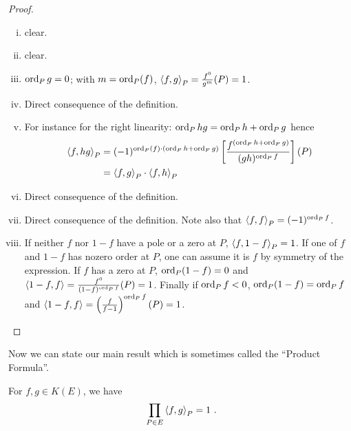 \begin{proof}
~
\begin{enumerate}[(i)]
\item
clear.
\item
clear.
\item
$\operatorname{ord}_{P}g=0$; with $m=\operatorname{ord}_{P}(f)$, $\left\langle f,g \right \rangle_{P} = \frac{f^0}{g^m}(P) = 1$.
\item
Direct consequence of the definition.
\item
For instance for the right linearity: $\operatorname{ord}_{P}{hg} = \operatorname{ord}_{P}{h}+\operatorname{ord}_{P}{g}$ hence 
\begin{align*}
\left\langle f,hg \right \rangle_{P} &= (-1)^{\operatorname{ord}_{P}(f)\cdot(\operatorname{ord}_{P}{h}+\operatorname{ord}_{P}{g})}\left[\frac{f^{(\operatorname{ord}_{P}{h}+\operatorname{ord}_{P}{g})}}{(gh)^{\operatorname{ord}_{P}f}}\right](P) \\
&=\left\langle f,g \right \rangle_{P} \cdot \left\langle f,h \right \rangle_{P}
\end{align*}
\item
Direct consequence of the definition.
\item
Direct consequence of the definition. Note also that $\left\langle f,f \right \rangle_P = (-1)^{\operatorname{ord}_{P}f}$.
\item
If neither $f$ nor $1-f$ have a pole or a zero at $P$, $\left\langle f,1-f \right \rangle_{P}=1$. If one of $f$ and $1-f$ has nozero order at $P$, one can assume it is $f$ by symmetry of the expression. If $f$ has a zero at $P$, $\operatorname{ord}_{P}(1-f)=0$ and $\left\langle 1-f,f \right \rangle=\frac{f^0}{(1-f)^{\operatorname{ord}_{P} f}}(P)=1$. Finally if $\operatorname{ord}_{P}f < 0$, $\operatorname{ord}_{P}(1-f) = \operatorname{ord}_{P}f$ and $\left\langle 1-f,f \right \rangle=\left(\frac{f}{f-1}\right)^{\operatorname{ord}_{P}f}(P)=1$.
\end{enumerate}
\end{proof}


Now we can state our main result which is sometimes called the ``Product Formula''.

\begin{theo}
\label{t2.7.10}
For $f,g\in K(E)$, we have
$$
\prod_{P\in E}\ts{f,g}_{P}=1\ .
$$
\end{theo}

